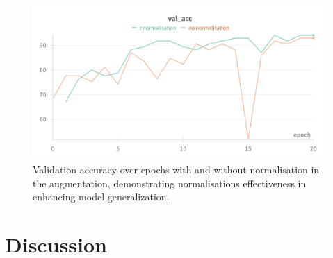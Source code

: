 \documentclass[12pt, a4paper]{article}
\begin{document}
\begin{figure}[htbp]
  \centering
  \includegraphics[width=\textwidth]{figures/znorm_val_acc.png}
  \caption{Validation accuracy over epochs with and without normalisation in the augmentation, demonstrating normalisations effectiveness in enhancing model generalization.}
  \label{fig:normalisation_accuracy}
\end{figure}

\section{Discussion}








\end{document}

